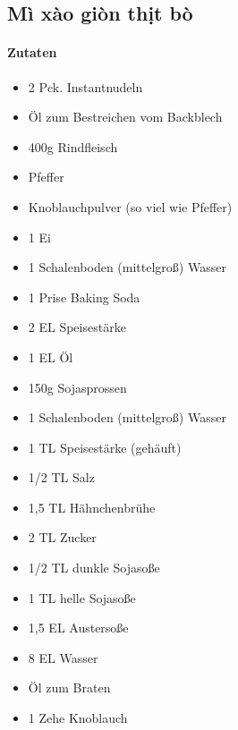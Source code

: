 \newpage
{}
\subsection{Mì xào giòn thịt bò}
\paragraph{Zutaten}
\begin{itemize}[noitemsep]
	\item 2 Pck. Instantnudeln
	\item Öl zum Bestreichen vom Backblech
	\item 400g Rindfleisch
	\item Pfeffer
	\item Knoblauchpulver (so viel wie Pfeffer)
	\item 1 Ei
	\item 1 Schalenboden (mittelgroß) Wasser
	\item 1 Prise Baking Soda 
	\item 2 EL Speisestärke
	\item 1 EL Öl
	\vspace{0.5cm}
	\item 150g Sojasprossen
	\item 1 Schalenboden (mittelgroß) Wasser
	\item 1 TL Speisestärke (gehäuft)
	\item 1/2 TL Salz
	\item 1,5 TL Hähnchenbrühe
	\item 2 TL Zucker
	\item 1/2 TL dunkle Sojasoße
	\item 1 TL helle Sojasoße
	\item 1,5 EL Austersoße
	\item 8 EL Wasser
	\item Öl zum Braten
	\item 1 Zehe Knoblauch
\end{itemize}
